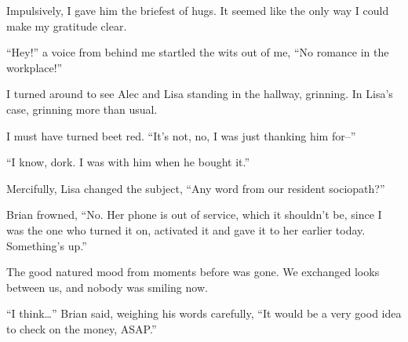 Impulsively, I gave him the briefest of hugs.  It seemed like the only way I could make my gratitude clear.



``Hey!'' a voice from behind me startled the wits out of me, ``No romance in the workplace!''



I turned around to see Alec and Lisa standing in the hallway, grinning.  In Lisa's case, grinning more than usual.



I must have turned beet red.  ``It's not, no, I was just thanking him for--''



``I know, dork.  I was with him when he bought it.''



Mercifully, Lisa changed the subject, ``Any word from our resident sociopath?''



Brian frowned, ``No.  Her phone is out of service, which it shouldn't be, since I was the one who turned it on, activated it and gave it to her earlier today.  Something's up.''



The good natured mood from moments before was gone.  We exchanged looks between us, and nobody was smiling now.



``I think\ldots'' Brian said, weighing his words carefully, ``It would be a very good idea to check on the money, ASAP.''





